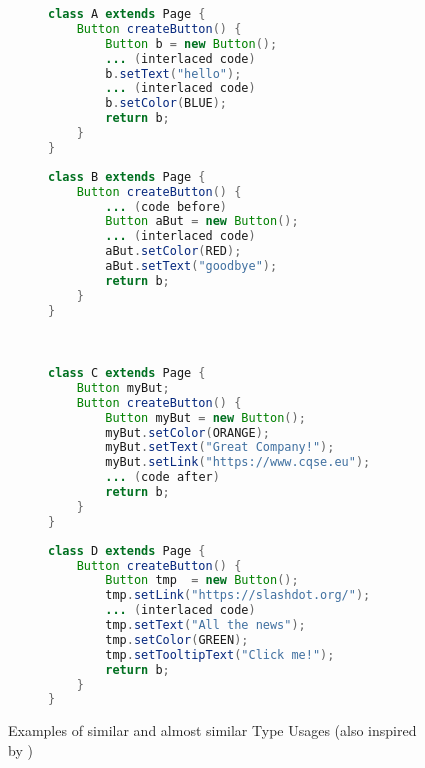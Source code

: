 \begin{figure}[h]
    \centering
    \begin{subfigure}[c]{0.47\textwidth}
        \begin{lstlisting}[language=java, frame=single, basicstyle=\footnotesize]
class A extends Page {
    Button createButton() {
        Button b = new Button();
        ... (interlaced code)
        b.setText("hello");
        ... (interlaced code)
        b.setColor(BLUE);
        return b;
    }
}
        \end{lstlisting}
    \end{subfigure}
    \quad
    \begin{subfigure}[c]{0.47\textwidth}
        \begin{lstlisting}[language=java, frame=single, basicstyle=\footnotesize]
class B extends Page {
    Button createButton() {
        ... (code before)
        Button aBut = new Button();
        ... (interlaced code)
        aBut.setColor(RED);
        aBut.setText("goodbye");
        return b;
    }
}
        \end{lstlisting}
    \end{subfigure}
    \\

    \begin{subfigure}[c]{0.47\textwidth}
        \begin{lstlisting}[language=java, frame=single, basicstyle=\footnotesize, showstringspaces=false]
class C extends Page {
    Button myBut;
    Button createButton() {
        Button myBut = new Button();
        myBut.setColor(ORANGE);
        myBut.setText("Great Company!");
        myBut.setLink("https://www.cqse.eu");
        ... (code after)
        return b;
    }
}
        \end{lstlisting}
    \end{subfigure}
    \quad
    \begin{subfigure}[c]{0.47\textwidth}
        \begin{lstlisting}[language=java, frame=single, basicstyle=\footnotesize, showstringspaces=false]
class D extends Page {
    Button createButton() {
        Button tmp  = new Button();
        tmp.setLink("https://slashdot.org/");
        ... (interlaced code)
        tmp.setText("All the news");
        tmp.setColor(GREEN);
        tmp.setTooltipText("Click me!");
        return b;
    }
}
        \end{lstlisting}
    \end{subfigure}

    \caption{Examples of similar and almost similar Type Usages (also inspired by \cite{monperrus2013detecting})}
    \label{fig:sim_asim}
\end{figure}

